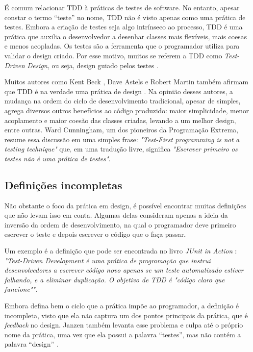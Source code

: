 É comum relacionar TDD à práticas de testes de software. No entanto, apesar constar o
termo ``teste'' no nome, TDD não é visto apenas como uma prática de testes.
Embora a criação de testes seja algo intrínseco ao processo, TDD é uma prática
que auxilia o desenvolvedor a desenhar classes mais flexíveis, mais coesas e
menos acopladas. Os testes são a ferramenta que o programador utiliza para
validar o design criado. Por esse motivo, muitos se referem a TDD como
\textit{Test-Driven Design}, ou seja, design guiado pelos testes
\cite{tdd-taxonomy}.

Muitos autores como Kent Beck \cite{aim-fire}, Dave Astels \cite{astels-tdd} e
Robert Martin \cite{bob-martin} também afirmam que TDD é na verdade uma prática de
design \cite{tdd-taxonomy} \cite{aim-fire}.
Na opinião desses autores, a mudança na ordem do ciclo de
desenvolvimento tradicional, apesar de simples, agrega diversos outros
benefícios ao código produzido: maior simplicidade, menor acoplamento e maior
coesão das classes criadas, levando a um melhor design, entre
outras. Ward Cunningham, um dos pioneiros da Programação Extrema, resume essa 
discussão em uma simples frase: \textit{"Test-First programming is not a testing technique"} 
que, em uma tradução livre, significa \textit{"Escrever primeiro os testes
não é uma prática de testes"}.

\subsection{Definições incompletas}

Não obstante o foco da prática em design, é possível encontrar muitas definições que
não levam isso em conta. Algumas delas consideram apenas a ideia da
inversão da ordem de desenvolvimento, na qual o programador deve primeiro
escrever o teste e depois escrever o código que o faça passar.

Um exemplo é a definição que pode ser encontrada no livro \textit{JUnit
in Action} \cite{junit-in-action}: \textit{"Test-Driven Development é uma
prática de programação que instrui desenvolvedores a escrever código novo
apenas se um teste automatizado estiver falhando, e a eliminar duplicação. O
objetivo de TDD é "código claro que funcione""}.

Embora defina bem o ciclo que a prática impõe ao programador, a definição é incompleta, visto
que ela não captura um dos pontos principais da prática, que é \textit{feedback} no design. 
Janzen também levanta esse problema e culpa até o próprio nome da prática, uma vez
que ela possui a palavra ``testes'', mas não contém a palavra ``design'' 
\cite{tdd-really-improve}.

